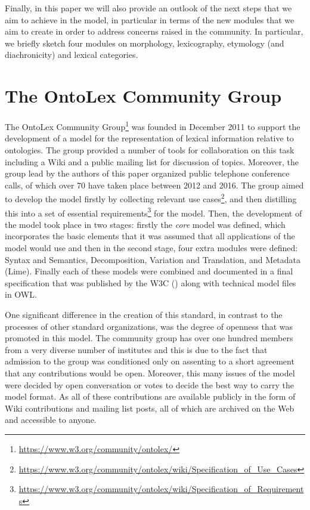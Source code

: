 \documentclass[12pt,a4paper]{elex2017}
\begin{document}
Finally, in this paper we will also provide an outlook of the next steps that we
aim to achieve in the model, in particular in terms of the new modules that we
aim to create in order to address concerns raised in the community. In
particular, we briefly sketch four modules on morphology, lexicography,
etymology (and diachronicity) and lexical categories.

\section{The OntoLex Community Group}

The OntoLex Community
Group\footnote{\url{https://www.w3.org/community/ontolex/}}  was founded in
December 2011 to support the development of a model for the representation of
lexical information relative to ontologies. The group provided a number of tools
for collaboration on this task including a Wiki and a public mailing list for
discussion of topics. Moreover, the group lead by the authors of this paper
organized public telephone conference calls, of which over 70 have taken place
between 2012 and 2016. The group aimed to develop the model firstly by
collecting relevant use
cases\footnote{\url{https://www.w3.org/community/ontolex/wiki/Specification_of_Use_Cases}},
and then distilling this into a set of essential
requirements\footnote{\url{https://www.w3.org/community/ontolex/wiki/Specification_of_Requirements}}
for the model. Then, the development of the model took place in two stages:
firstly the \emph{core} model was defined, which incorporates the basic elements
that it was assumed that all applications of the model would use and then in the
second stage, four extra modules were defined: Syntax and Semantics,
Decomposition, Variation and Translation, and Metadata (Lime).
Finally each of these models were combined and documented in a final
specification that was published by the W3C (\cite{cimiano2016lexicon}) along with
technical model files in OWL.

One significant difference in the creation of this standard, in contrast to the
processes of other standard organizations, was the degree of openness that was
promoted in this model. The community group has over one hundred members from a
very diverse number of institutes and this is due to the fact that admission to
the group was conditioned only on assenting to a short agreement that
any contributions would be open. Moreover, this many issues of the model were
decided by open conversation or votes to decide the best way to carry the model
format. As all of these contributions are available publicly in the form of Wiki
contributions and mailing list posts, all of which are archived on the Web and
accessible to anyone. 
\end{document}
